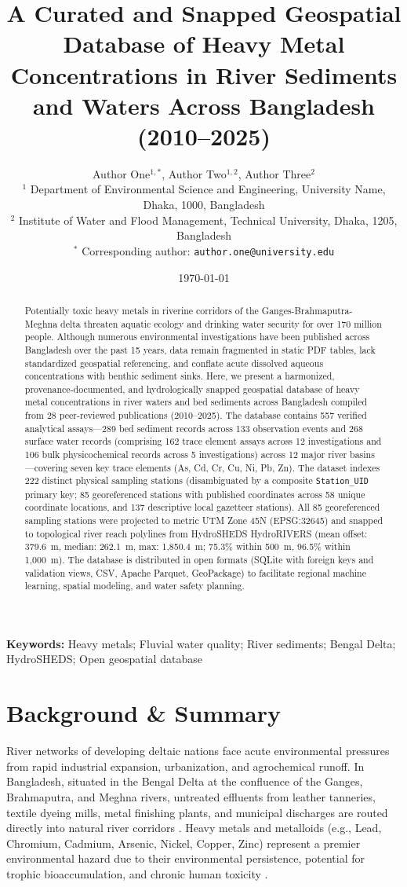 \documentclass[11pt,a4paper]{article}
\title{\textbf{\Large A Curated and Snapped Geospatial Database of Heavy Metal Concentrations in River Sediments and Waters Across Bangladesh (2010--2025)}}
\author{
    Author One$^{1,*}$, Author Two$^{1,2}$, Author Three$^{2}$ \\[0.5em]
    \small $^{1}$ Department of Environmental Science and Engineering, University Name, Dhaka, 1000, Bangladesh \\
    \small $^{2}$ Institute of Water and Flood Management, Technical University, Dhaka, 1205, Bangladesh \\
    \small $^*$ Corresponding author: \texttt{author.one@university.edu}
}
\date{\today}
\begin{document}
\maketitle
\linenumbers

\begin{abstract}
Potentially toxic heavy metals in riverine corridors of the Ganges-Brahmaputra-Meghna delta threaten aquatic ecology and drinking water security for over 170 million people. Although numerous environmental investigations have been published across Bangladesh over the past 15 years, data remain fragmented in static PDF tables, lack standardized geospatial referencing, and conflate acute dissolved aqueous concentrations with benthic sediment sinks. Here, we present a harmonized, provenance-documented, and hydrologically snapped geospatial database of heavy metal concentrations in river waters and bed sediments across Bangladesh compiled from 28 peer-reviewed publications (2010--2025). The database contains 557 verified analytical assays---289 bed sediment records across 133 observation events and 268 surface water records (comprising 162 trace element assays across 12 investigations and 106 bulk physicochemical records across 5 investigations) across 12 major river basins---covering seven key trace elements (As, Cd, Cr, Cu, Ni, Pb, Zn). The dataset indexes 222 distinct physical sampling stations (disambiguated by a composite \texttt{Station\_UID} primary key; 85 georeferenced stations with published coordinates across 58 unique coordinate locations, and 137 descriptive local gazetteer stations). All 85 georeferenced sampling stations were projected to metric UTM Zone 45N (EPSG:32645) and snapped to topological river reach polylines from HydroSHEDS HydroRIVERS (mean offset: 379.6~m, median: 262.1~m, max: 1,850.4~m; 75.3\% within 500~m, 96.5\% within 1,000~m). The database is distributed in open formats (SQLite with foreign keys and validation views, CSV, Apache Parquet, GeoPackage) to facilitate regional machine learning, spatial modeling, and water safety planning.
\end{abstract}

\noindent\textbf{Keywords:} Heavy metals; Fluvial water quality; River sediments; Bengal Delta; HydroSHEDS; Open geospatial database

\section*{Background \& Summary}
River networks of developing deltaic nations face acute environmental pressures from rapid industrial expansion, urbanization, and agrochemical runoff. In Bangladesh, situated in the Bengal Delta at the confluence of the Ganges, Brahmaputra, and Meghna rivers, untreated effluents from leather tanneries, textile dyeing mills, metal finishing plants, and municipal discharges are routed directly into natural river corridors \citep{Islam2015,Bhuiyan2015}. Heavy metals and metalloids (e.g., Lead, Chromium, Cadmium, Arsenic, Nickel, Copper, Zinc) represent a premier environmental hazard due to their environmental persistence, potential for trophic bioaccumulation, and chronic human toxicity \citep{Jarup2003,Tchounwou2012}.
\end{document}
